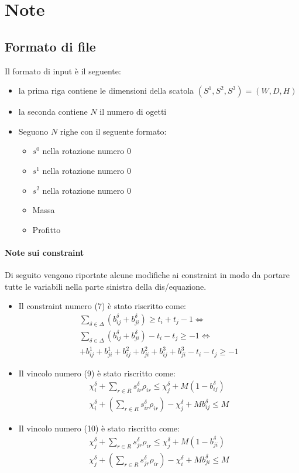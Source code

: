 \documentclass{scrartcl}
\begin{document}
\section{Note}

\subsection{Formato di file}
Il formato di input è il seguente:
\begin{itemize}
	\item la prima riga contiene le dimensioni della scatola $(S^1, S^2, S^3) = (W, D, H)$
	\item la seconda contiene $N$ il numero di ogetti
	\item Seguono $N$ righe con il seguente formato:
	\begin{itemize}
		\item $s^0$ nella rotazione numero $0$
		\item $s^1$ nella rotazione numero $0$
		\item $s^2$ nella rotazione numero $0$
		\item Massa
		\item Profitto
	\end{itemize}
\end{itemize}

\paragraph{Note sui constraint}
Di seguito vengono riportate alcune modifiche ai constraint in modo da portare
tutte le variabili nella parte sinistra della dis/equazione.
\begin{itemize}
	\item 
	Il constraint numero (7) è stato riscritto come:
	$$
	\begin{array}{l}
	\sum_{\delta \in \Delta}(b_{ij}^\delta + b_{ji}^\delta) \geq t_i + t_j - 1 \iff \\
	\sum_{\delta \in \Delta}(b_{ij}^\delta + b_{ji}^\delta) - t_i - t_j \geq - 1 \iff \\
	+ b_{ij}^1 + b_{ji}^1 + b_{ij}^2 + b_{ji}^2 + b_{ij}^3 + b_{ji}^3 - t_i - t_j \geq  -1
	\end{array}
	$$
	\item 
	Il vincolo numero (9) è stato riscritto come:
	$$
	\begin{array}{l}
	\chi_i^\delta + \sum_{r \in R} s_{ir}^\delta \rho_{ir} \leq \chi_j^\delta + M(1 - b_{ij}^\delta)\\
	\chi_i^\delta + (\sum_{r \in R} s_{ir}^\delta \rho_{ir}) -  \chi_j^\delta + M b_{ij}^\delta \leq M
	\end{array}
	$$
	\item 
	Il vincolo numero (10) è stato riscritto come:
	$$
	\begin{array}{l}
	\chi_j^\delta + \sum_{r \in R} s_{jr}^\delta \rho_{ir} \leq \chi_j^\delta + M(1 - b_{ji}^\delta)\\
	\chi_j^\delta + (\sum_{r \in R} s_{jr}^\delta \rho_{ir}) -  \chi_i^\delta + M b_{ji}^\delta \leq M
	\end{array}
	$$
\end{itemize}
\end{document}

